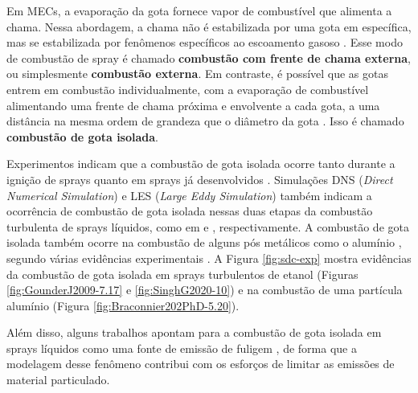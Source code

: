 Em MECs, a evaporação da gota fornece vapor de combustível que alimenta a chama.
Nessa abordagem, a chama não é estabilizada por uma gota em específica, mas se estabilizada por fenômenos específicos ao escoamento gasoso \cite{ChiuH1982,Law2006}.
Esse modo de combustão de spray é chamado \textbf{combustão com frente de chama externa}, ou simplesmente \textbf{combustão externa}.
Em contraste, é possível que as gotas entrem em combustão individualmente, com a evaporação de combustível alimentando uma frente de chama próxima e envolvente a cada gota, a uma distância na mesma ordem de grandeza que o diâmetro da gota \cite{ChiuH1977}.
Isso é chamado \textbf{combustão de gota isolada}.

Experimentos indicam que a combustão de gota isolada ocorre tanto durante a ignição	de sprays \cite{AggarwalS2014} quanto em sprays já desenvolvidos \cite{ChenG1996CF,GounderJ2009PhD,SinghG2020}.
Simulações DNS (\emph{Direct Numerical Simulation}) e LES (\emph{Large Eddy Simulation}) também indicam a ocorrência de combustão de gota isolada nessas duas etapas da combustão turbulenta de sprays líquidos, como em \cite{BorghesiG2013CF} e \cite{PaulhiacD2020,BojkoDesJardin2017CF}, respectivamente.
A combustão de gota isolada também ocorre na combustão de alguns pós metálicos como o alumínio \cite{Bergthorson2015,Julien2017,Baumann2020}, segundo várias evidências experimentais \cite{Braconnier2020Pre,Braconnier2022,Bucher1999,Halter2023}.
A Figura \ref{fig:sdc-exp} mostra evidências da combustão de gota isolada em sprays turbulentos de etanol (Figuras \ref{fig:GounderJ2009-7.17} e \ref{fig:SinghG2020-10}) e na combustão de uma partícula alumínio (Figura \ref{fig:Braconnier202PhD-5.20}). %

Além disso, alguns trabalhos apontam para a combustão de gota isolada em sprays líquidos como uma fonte de emissão de fuligem \cite[e as referências 3-13 ali citadas]{FachiniF2005}, de forma que a modelagem desse fenômeno contribui com os esforços de limitar as emissões de material particulado.

